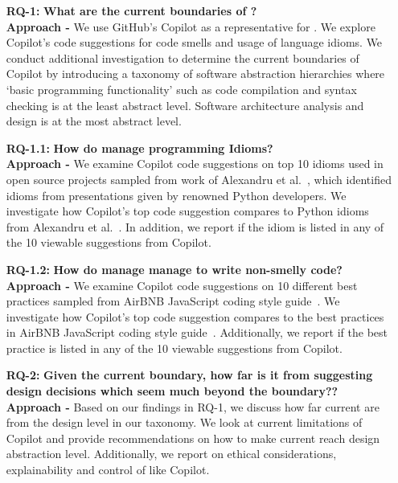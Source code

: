 \begin{enumerate}
  \item[\textbf{RQ-1: }]
  \textbf{What are the current boundaries of \cct{}?} \\
  \textbf{Approach -} We use GitHub's Copilot as a representative for \cct{}. We explore Copilot's code suggestions for code smells and usage of language idioms. We conduct additional investigation to determine the current boundaries of Copilot by introducing a taxonomy of software abstraction hierarchies where ‘basic programming functionality’ such as code compilation and syntax checking is at the least abstract level. Software architecture analysis and design is at the most abstract level. 
  
  \item[\textbf{RQ-1.1: }]
  \textbf{How do \cct{} manage programming Idioms?} \\
  \textbf{Approach -} We examine Copilot code suggestions on top 10 idioms used in open source projects sampled from work of Alexandru et al.~\cite{Alexandru2018}, which identified idioms from presentations given by renowned Python developers. We investigate how Copilot's top code suggestion compares to Python idioms from Alexandru et al.~\cite{Alexandru2018}. In addition, we report if the idiom is listed in any of the 10 viewable suggestions from Copilot.
  
  \item[\textbf{RQ-1.2: }]
  \textbf{How do \cct{} manage manage to write non-smelly code?} \\
\textbf{Approach -} We examine Copilot code suggestions on 10 different best practices sampled from AirBNB JavaScript coding style guide~\cite{airbnb_code}. We investigate how Copilot's top code suggestion compares to the best practices in AirBNB JavaScript coding style guide~\cite{airbnb_code}. Additionally, we report if the best practice is listed in any of the 10 viewable suggestions from Copilot. 
 
  \item[\textbf{RQ-2: }]
  \textbf{Given the current boundary, how far is it from suggesting design decisions which seem much beyond the boundary??} \\
  \textbf{Approach -} Based on our findings in RQ-1, we discuss how far current \cct{} are from the design level in our taxonomy. We look at current limitations of Copilot and provide recommendations on how to make current \cct{} reach design abstraction level. Additionally, we report on ethical considerations, explainability and control of \cct{} like Copilot. 
\end{enumerate}